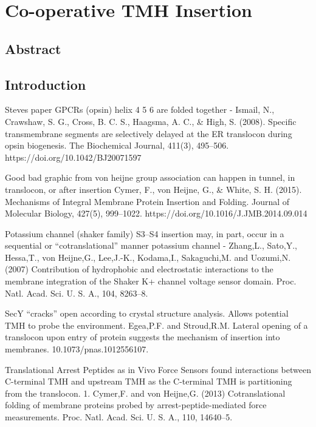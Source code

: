 
\chapter{Co-operative TMH Insertion}
\section{Abstract}
\section{Introduction}

Steves paper GPCRs (opsin) helix 4 5 6 are folded together - Ismail, N., Crawshaw, S. G., Cross, B. C. S., Haagsma, A. C., \& High, S. (2008). Specific transmembrane segments are selectively delayed at the ER translocon during opsin biogenesis. The Biochemical Journal, 411(3), 495–506. https://doi.org/10.1042/BJ20071597



Good bad graphic from von heijne group association can happen in tunnel, in translocon, or after insertion Cymer, F., von  Heijne, G., \& White, S. H. (2015). Mechanisms of Integral Membrane Protein Insertion and Folding. Journal of Molecular Biology, 427(5), 999–1022. https://doi.org/10.1016/J.JMB.2014.09.014



Potassium channel (shaker family) S3–S4 insertion may, in part, occur in a sequential or “cotranslational” manner potassium channel - Zhang,L., Sato,Y., Hessa,T., von Heijne,G., Lee,J.-K., Kodama,I., Sakaguchi,M. and Uozumi,N. (2007) Contribution of hydrophobic and electrostatic interactions to the membrane integration of the Shaker K+ channel voltage sensor domain. Proc. Natl. Acad. Sci. U. S. A., 104, 8263–8.




SecY “cracks” open according to crystal structure analysis. Allows potential TMH to probe the environment. Egea,P.F. and Stroud,R.M. Lateral opening of a translocon upon entry of protein suggests the mechanism of insertion into membranes. 10.1073/pnas.1012556107.




Translational Arrest Peptides as in Vivo Force Sensors found interactions between C-terminal TMH and upstream TMH as the C-terminal TMH is partitioning from the translocon. 1. Cymer,F. and von Heijne,G. (2013) Cotranslational folding of membrane proteins probed by arrest-peptide-mediated force measurements. Proc. Natl. Acad. Sci. U. S. A., 110, 14640–5.

